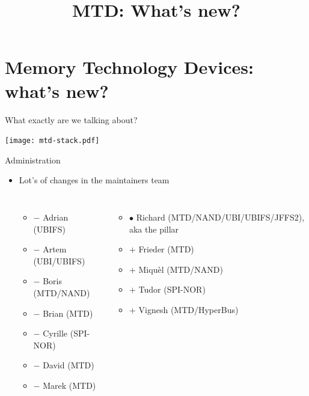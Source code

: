 \documentclass[aspectratio=169,obeyspaces,spaces,hyphens,dvipsnames]{beamer}
\title{MTD: What's new?}
\institute{Bootlin \hfill sigma star gmbh}
\begin{document}
\section{Memory Technology Devices: what's new?}

\newcommand\added{\item[$+$]}
\newcommand\removed{\item[$-$]}
\newcommand\surviving{\item[$\bullet$]}

\begin{frame}{What exactly are we talking about?}
  \begin{center}
    \texttt{[image: mtd-stack.pdf]}
  \end{center}
\end{frame}

\begin{frame}{Administration}
  \begin{itemize}
  \item Lot's of changes in the maintainers team
    \begin{columns}
      \begin{itemize}
        \removed Adrian (UBIFS)
        \removed Artem (UBI/UBIFS)
        \removed Boris (MTD/NAND)
        \removed Brian (MTD)
        \removed Cyrille (SPI-NOR)
        \removed David (MTD)
        \removed Marek (MTD)
      \end{itemize}
      \begin{itemize}
        \surviving Richard (MTD/NAND/UBI/UBIFS/JFFS2), aka the pillar
        \added Frieder (MTD)
        \added Miquèl (MTD/NAND)
        \added Tudor (SPI-NOR)
        \added Vignesh (MTD/HyperBus)
      \end{itemize}
    \end{columns}
  \end{itemize}
\end{frame}
\end{document}
